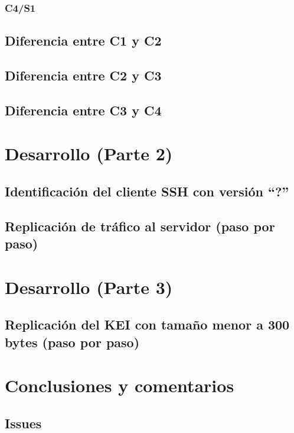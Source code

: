 \documentclass[letter,12pt]{article}
\begin{document}
\subsubsection{C4/S1}

\subsection{Diferencia entre C1 y C2}

\subsection{Diferencia entre C2 y C3}

\subsection{Diferencia entre C3 y C4}

\newpage

\section{Desarrollo (Parte 2)}

\subsection{Identificación del cliente SSH con versión \textquotedblleft?\textquotedblright}

\subsection{Replicación de tráfico al servidor (paso por paso)}

\section{Desarrollo (Parte 3)}

\subsection{Replicación del KEI con tamaño menor a 300 bytes (paso por paso)}

\section*{Conclusiones y comentarios}
\subsection*{Issues}
\end{document}
